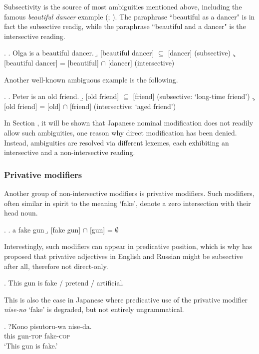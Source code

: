 Subsectivity is the source of most ambiguities mentioned above, including the famous \textit{beautiful dancer} example (\citealt[145]{larson:1995:olga}; \citealt{vendler:1957:verbs, siegel:1976:capturing}). The paraphrase ``beautiful as a dancer" is in fact the subsective readig, while the paraphrase ``beautiful and a dancer" is the intersective reading.

\ex. \a. Olga is a beautiful dancer.
\b. [beautiful dancer] $\subseteq$ [dancer] (subsective)
\c. [beautiful dancer] = [beautiful] $\cap$ [dancer] (intersective)

Another well-known ambiguous example is the following.

\ex. \a. Peter is an old friend. \hfill \citep[146]{larson:1998:events}
\b. [old friend] $\subseteq$ [friend] (subsective: `long-time friend’)
\c. [old friend] = [old] $\cap$ [friend] (intersective: `aged friend’)

In Section , it will be shown that Japanese nominal modification does not readily allow such ambiguities, one reason why direct modification has been denied. Instead, ambiguities are resolved via different lexemes, each exhibiting an intersective and a non-intersective reading.

\subsubsection{Privative modifiers}

Another group of non-intersective modifiers is privative modifiers. Such modifiers, often similar in spirit to the meaning `fake’, denote a zero intersection with their head noun.

\ex. \a. a fake gun
\b. [fake gun] $\cap$ [gun] = $\emptyset$ \hfill \citep[25]{morzycki:2016:mod}

Interestingly, such modifiers can appear in predicative position, which is why \citet{partee:2009:formal} has proposed that privative adjectives in English and  Russian might be subsective after all, therefore not direct-only.

\ex. This gun is fake / pretend / artificial. \hfill \citep[25]{morzycki:2016:mod}

This is also the case in Japanese where predicative use of the privative modifier \textit{nise-no} `fake' is degraded, but not entirely ungrammatical.

\exg. ?Kono pisutoru-wa nise-da.\\
this gun-\textsc{top} fake-\textsc{cop}\\
`This gun is fake.'

